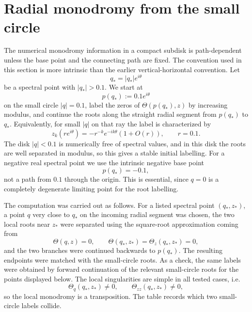 \documentclass[11pt,a4paper,reqno]{amsart}
\theoremstyle{remark}
\begin{document}
\section{Radial monodromy from the small circle}
\label{sec:radial-monodromy}
The numerical monodromy information in a compact subdisk is path-dependent unless the base point and the connecting path are fixed.  The convention used in this section is more intrinsic than the earlier vertical-horizontal convention.  Let
\[
        q_*=|q_*|e^{i\theta}
\]
be a spectral point with \(|q_*|>0.1\).  We start at
\[
        p(q_*):=0.1e^{i\theta}
\]
on the small circle \(|q|=0.1\), label the zeros of \(\Theta(p(q_*),z)\) by increasing modulus, and continue the roots along the straight radial segment from \(p(q_*)\) to \(q_*\).  Equivalently, for small \(|q|\) on that ray the label is characterized by
\[
        z_k(re^{i\theta})=-r^{-k}e^{-ik\theta}(1+O(r)),
        \qquad r=0.1.
\]
The disk \(|q|<0.1\) is numerically free of spectral values, and in this disk the roots are well separated in modulus, so this gives a stable initial labelling.  For a negative real spectral point we use the intrinsic negative base point
\[
        p(q_*)=-0.1,
\]
not a path from \(0.1\) through the origin.  This is essential, since \(q=0\) is a completely degenerate limiting point for the root labelling.

The computation was carried out as follows.  For a listed spectral point \((q_*,z_*)\), a point \(q\) very close to \(q_*\) on the incoming radial segment was chosen, the two local roots near \(z_*\) were separated using the square-root approximation coming from
\[
        \Theta(q,z)=0,
        \qquad
        \Theta(q_*,z_*)=\Theta_z(q_*,z_*)=0,
\]
and the two branches were continued backwards to \(p(q_*)\).  The resulting endpoints were matched with the small-circle roots.  As a check, the same labels were obtained by forward continuation of the relevant small-circle roots for the points displayed below.  The local singularities are simple in all tested cases, i.e.
\[
        \Theta_q(q_*,z_*)\neq0,
        \qquad
        \Theta_{zz}(q_*,z_*)\neq0,
\]
so the local monodromy is a transposition.  The table records which two small-circle labels collide.
\end{document}
